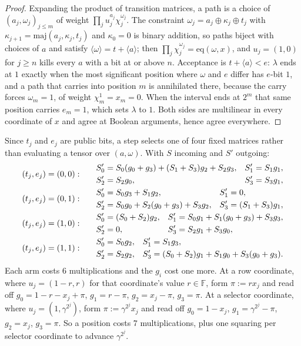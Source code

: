 \documentclass[11pt]{article}
\newcommand{\F}{\mathbb{F}}
\newcommand{\eq}{\mathrm{eq}}
\newcommand{\val}[1]{\langle #1 \rangle}
\newcommand{\maj}{\mathrm{maj}}
\theoremstyle{plain}
\begin{document}
\begin{proof}
Expanding the product of transition matrices, a path is a choice of $(a_j,\omega_j)_{j\le m}$
of weight $\prod_j u_j^{a_j}\chi_j^{\omega_j}$. The constraint
$\omega_j=a_j\oplus\kappa_j\oplus t_j$ with $\kappa_{j+1}=\maj(a_j,\kappa_j,t_j)$ and
$\kappa_0=0$ is binary addition, so paths biject with choices of $a$ and satisfy
$\val\omega=t+\val a$; then $\prod_j\chi_j^{\omega_j}=\eq(\omega,x)$, and $u_j=(1,0)$ for
$j\ge n$ kills every $a$ with a bit at or above $n$. Acceptance is $t+\val a<e$: $\lambda$
ends at $1$ exactly when the most significant position where $\omega$ and $e$ differ has
$e$-bit $1$, and a path that carries into position $m$ is annihilated there, because the carry
forces $\omega_m=1$, of weight $\chi_m^1=x_m=0$. When the interval ends at $2^m$ that same
position carries $e_m=1$, which sets $\lambda$ to $1$. Both sides are multilinear in every coordinate of $x$ and
agree at Boolean arguments, hence agree everywhere.
\end{proof}

Since $t_j$ and $e_j$ are public bits, a step selects one of four fixed matrices rather than
evaluating a tensor over $(a,\omega)$. With $S$ incoming and $S'$ outgoing:
\[
\renewcommand{\arraystretch}{1.25}
\begin{array}{l@{\qquad}l}
(t_j,e_j)=(0,0): &
\begin{aligned}
S_0'&=S_0(g_0+g_3)+(S_1+S_3)g_2+S_2g_3, & S_1'&=S_1g_1,\\
S_2'&=S_2g_0, & S_3'&=S_3g_1,
\end{aligned}\\[2.2ex]
(t_j,e_j)=(0,1): &
\begin{aligned}
S_0'&=S_0g_3+S_1g_2, & S_1'&=0,\\
S_2'&=S_0g_0+S_2(g_0+g_3)+S_3g_2, & S_3'&=(S_1+S_3)g_1,
\end{aligned}\\[2.2ex]
(t_j,e_j)=(1,0): &
\begin{aligned}
S_0'&=(S_0+S_2)g_2, & S_1'&=S_0g_1+S_1(g_0+g_3)+S_3g_3,\\
S_2'&=0, & S_3'&=S_2g_1+S_3g_0,
\end{aligned}\\[2.2ex]
(t_j,e_j)=(1,1): &
\begin{aligned}
S_0'&=S_0g_2, & S_1'&=S_1g_3,\\
S_2'&=S_2g_2, & S_3'&=(S_0+S_2)g_1+S_1g_0+S_3(g_0+g_3).
\end{aligned}
\end{array}
\]
Each arm costs $6$ multiplications and the $g_i$ cost one more. At a row coordinate, where
$u_j=(1-r,r)$ for that coordinate's value $r\in\F$, form $\pi:=rx_j$ and read off
$g_0=1-r-x_j+\pi$, $g_1=r-\pi$, $g_2=x_j-\pi$, $g_3=\pi$. At a selector coordinate, where
$u_j=(1,\gamma^{2^j})$, form $\pi:=\gamma^{2^j}x_j$ and read off $g_0=1-x_j$,
$g_1=\gamma^{2^j}-\pi$, $g_2=x_j$, $g_3=\pi$. So a position costs $7$ multiplications, plus
one squaring per selector coordinate to advance $\gamma^{2^j}$.
\end{document}
